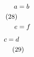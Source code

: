 \documentclass{article}
\begin{document}
\begin{align}
a &= b \notag \\
\tag{28} \\
e &= f
\end{align}
\begin{gather}
c = d \notag \\
\tag{29}
\end{gather}
\end{document}
